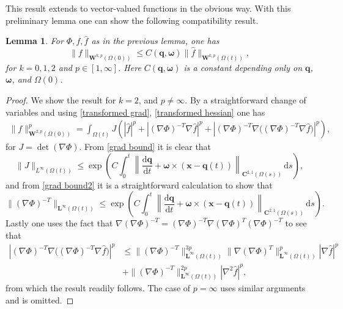 \documentclass[a4paper]{amsart}
\numberwithin{equation}{section}
\newcommand{\grad}{\nabla}
\theoremstyle{plain}
\newtheorem{lemma}[theorem]{Lemma}
\newcommand{\mbf}[1]{\mathbf{#1}}
\begin{document}
This result extends to vector-valued functions in the obvious way.
With this preliminary lemma one can show the following compatibility result.
\begin{lemma}
	\label{pullback lemma}
	For $\Phi,f, \widehat{f}$ as in the previous lemma, one has
	\[ \| f \|_{\mbf{W}^{k,p}(\Omega(0))} \leq C(\mbf{q}, \boldsymbol{\omega})\| \widehat{f} \|_{\mbf{W}^{k,p}(\Omega(t))},  \]
	for $k=0,1,2$ and $p \in [1,\infty]$.
	Here $C(\mbf{q}, \boldsymbol{\omega})$ is a constant depending only on $\mbf{q}$, $\mbf{\omega}$, and $\Omega(0)$.
\end{lemma}
\begin{proof}
	We show the result for $k =2$, and $p \neq \infty$.
	By a straightforward change of variables and using \eqref{transformed grad}, \eqref{transformed hessian} one has
	\begin{align*}
		\| f \|_{\mbf{W}^{2,p}(\Omega(0))}^p = \int_{\Omega(t)} J\left(|\widehat{f}|^p + |(\grad \Phi)^{-T} \grad \widehat{f}|^p + |(\grad \Phi)^{-T} \grad \big((\grad \Phi)^{-T} \grad \widehat{f}\big)|^p\right),
	\end{align*}
	for $J = \det(\grad \Phi)$.
	From \eqref{grad bound} it is clear that
	\[ \|J\|_{L^\infty(\Omega(t))} \leq \exp \left( C \int_0^t \left\| \frac{\mathrm{d}\mbf{q}}{\mathrm{d}t} + \boldsymbol{\omega} \times (\mbf{x} - \mbf{q}(t)) \right\|_{\mbf{C}^{2,1}(\Omega(s))} \, \mathrm{d}s \right), \]
	and from \eqref{grad bound2} it is a straightforward calculation to show that
	\[ \| (\grad \Phi)^{-T} \|_{\mbf{L}^\infty(\Omega(t))} \leq \exp\left( C \int_0^t \left\| \frac{\mathrm{d}\mbf{q}}{\mathrm{d}t} + \boldsymbol{\omega} \times (\mbf{x} - \mbf{q}(t)) \right\|_{\mbf{C}^{2,1}(\Omega(s))} \, \mathrm{d}s \right). \] 
	Lastly one uses the fact that $\grad (\grad \Phi)^{-T} = (\grad \Phi)^{-T} \grad (\grad \Phi)^T (\grad \Phi)^{-T}$ to see that
    \begin{align*}
        |(\grad \Phi)^{-T} \grad \big((\grad \Phi)^{-T} \grad \widehat{f}\big)|^p &\leq \|(\grad \Phi)^{-T}\|_{\mbf{L}^\infty(\Omega(t))}^{3p}\|\grad (\grad \Phi)^T\|_{\mbf{L}^\infty(\Omega(t))}^p |\grad \widehat{f}|^p\\
        &+ \|(\grad \Phi)^{-T}\|_{\mbf{L}^\infty(\Omega(t))}^{2p}|\grad^2 \widehat{f}|^p,
    \end{align*}
	from which the result readily follows.
	The case of $p = \infty$ uses similar arguments and is omitted.
\end{proof}
\end{document}
